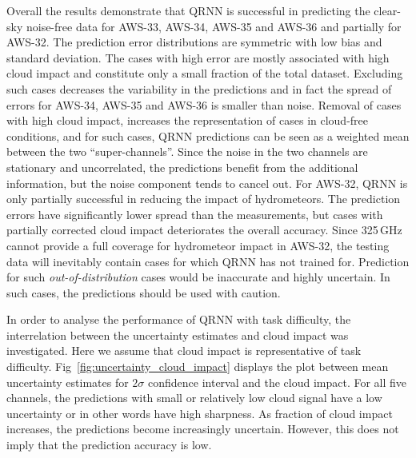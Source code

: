 \documentclass[amt, manuscript]{copernicus}
\begin{document}
Overall the results demonstrate that QRNN is successful in predicting the clear-sky noise-free data for AWS-33, AWS-34, AWS-35 and AWS-36 and partially for AWS-32. The prediction error distributions are symmetric with low bias and standard deviation. The cases with high error are mostly associated with high cloud impact and constitute only a small fraction of the total dataset. Excluding such cases decreases the variability in the predictions and in fact the spread of errors for AWS-34, AWS-35 and AWS-36 is smaller than noise. Removal of cases with high cloud impact, increases the representation of cases in cloud-free conditions, and for such cases, QRNN predictions can be seen as a weighted mean between the two ``super-channels''. Since the noise in the two channels are stationary and uncorrelated, the predictions benefit from the additional information, but the noise component tends to cancel out. For AWS-32, QRNN is only partially successful in reducing the impact of hydrometeors. The prediction errors have significantly lower spread than the measurements, but cases with partially corrected cloud impact deteriorates the overall accuracy. Since 325\,GHz cannot provide a full coverage for hydrometeor impact in AWS-32, the testing data will inevitably contain cases for which QRNN has not trained for. Prediction for such \textit{out-of-distribution} cases would be inaccurate and highly uncertain. In such cases, the predictions should be used with caution. 

In order to analyse the performance of QRNN with task difficulty, the interrelation between the uncertainty estimates and cloud impact was investigated. Here we assume that cloud impact is representative of task difficulty. Fig~\ref{fig:uncertainty_cloud_impact} displays the plot between mean uncertainty estimates for $2\sigma$ confidence interval and the cloud impact. For all five channels, the predictions with small or relatively low cloud signal have a low uncertainty or in other words have high sharpness. As fraction of cloud impact increases, the predictions become increasingly uncertain. However, this does not imply that the prediction accuracy is low. 
\end{document}
